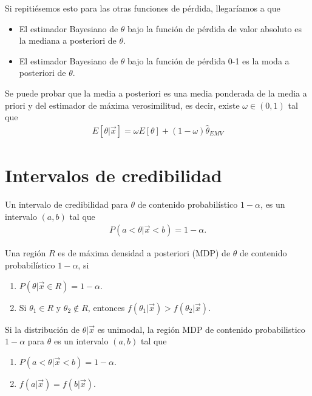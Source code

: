 Si repitiésemos esto para las otras funciones de pérdida, llegaríamos a que
\begin{itemize}
    \item El estimador Bayesiano de $\theta$ bajo la función de pérdida de valor absoluto es la mediana a posteriori de $\theta$.
    \item El estimador Bayesiano de $\theta$ bajo la función de pérdida 0-1 es la moda a posteriori de $\theta$.
\end{itemize}

\begin{obs}
    Se puede probar que la media a posteriori es una media ponderada de la media a priori y del estimador de máxima verosimilitud, es decir, existe $\omega \in (0,1)$ tal que
    \begin{align*}
        E[\theta | \vec{x}] = \omega E[\theta] + (1 - \omega) \widehat{\theta}_{EMV}
    \end{align*}
\end{obs}

\section{Intervalos de credibilidad}

\begin{defi}
    Un intervalo de credibilidad para $\theta$ de contenido probabilístico $1 - \alpha$, es un intervalo $(a,b)$ tal que
    \begin{align*}
        P(a < \theta | \vec{x} < b) = 1 - \alpha.
    \end{align*}
\end{defi}

\begin{defi}
    Una región $R$ es de máxima densidad a posteriori (MDP) de $\theta$ de contenido probabilístico $1-\alpha$, si
    \begin{enumerate}
        \item $P(\theta | \vec{x} \in R) = 1 - \alpha$.
        \item Si $\theta_1 \in R$ y $\theta_2 \not \in R$, entonces $f(\theta_1 | \vec{x}) > f(\theta_2 | \vec{x})$.
    \end{enumerate}
\end{defi}

\begin{obs}
    Si la distribución de $\theta | \vec{x}$ es unimodal, la región MDP de contenido probabilistico $1-\alpha$ para $\theta$ es un intervalo $(a,b)$ tal que
    \begin{enumerate}
        \item $P(a < \theta | \vec{x} < b) = 1 - \alpha$.
        \item $f(a | \vec{x}) = f(b | \vec{x})$.
    \end{enumerate}
\end{obs}


